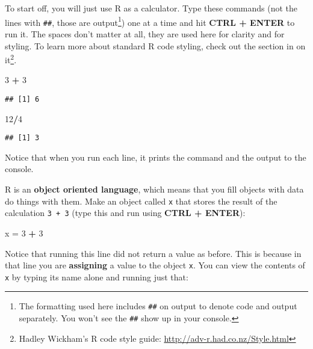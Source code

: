 \documentclass[]{book}
\newenvironment{Shaded}{\begin{snugshade}}{\end{snugshade}}
\newcommand{\DecValTok}[1]{\textcolor[rgb]{0.00,0.00,0.81}{#1}}
\newcommand{\StringTok}[1]{\textcolor[rgb]{0.31,0.60,0.02}{#1}}
\newcommand{\OperatorTok}[1]{\textcolor[rgb]{0.81,0.36,0.00}{\textbf{#1}}}
\newcommand{\NormalTok}[1]{#1}
\let\rmarkdownfootnote\footnote%
\def\footnote{\protect\rmarkdownfootnote}
\theoremstyle{definition}
\theoremstyle{definition}
\theoremstyle{definition}
\theoremstyle{remark}
\begin{document}
To start off, you will just use R as a calculator. Type these commands
(not the lines with \texttt{\#\#}, those are output\footnote{The
  formatting used here includes \texttt{\#\#} on output to denote code
  and output separately. You won't see the \texttt{\#\#} show up in your
  console.}) one at a time and hit \textbf{CTRL + ENTER} to run it. The
spaces don't matter at all, they are used here for clarity and for
styling. To learn more about standard R code styling, check out the
section in \citet{adv-r-cite} on it\footnote{Hadley Wickham's R code
  style guide: \url{http://adv-r.had.co.nz/Style.html}}.

\begin{Shaded}
\begin{Highlighting}[]
\DecValTok{3} \OperatorTok{+}\StringTok{ }\DecValTok{3}
\end{Highlighting}
\end{Shaded}

\begin{verbatim}
## [1] 6
\end{verbatim}

\begin{Shaded}
\begin{Highlighting}[]
\DecValTok{12}\OperatorTok{/}\DecValTok{4}
\end{Highlighting}
\end{Shaded}

\begin{verbatim}
## [1] 3
\end{verbatim}

Notice that when you run each line, it prints the command and the output
to the console.

R is an \textbf{object oriented language}, which means that you fill
objects with data do things with them. Make an object called \texttt{x}
that stores the result of the calculation \texttt{3\ +\ 3} (type this
and run using \textbf{CTRL + ENTER}):

\begin{Shaded}
\begin{Highlighting}[]
\NormalTok{x =}\StringTok{ }\DecValTok{3} \OperatorTok{+}\StringTok{ }\DecValTok{3}
\end{Highlighting}
\end{Shaded}

Notice that running this line did not return a value as before. This is
because in that line you are \textbf{assigning} a value to the object
\texttt{x}. You can view the contents of \texttt{x} by typing its name
alone and running just that:
\end{document}
